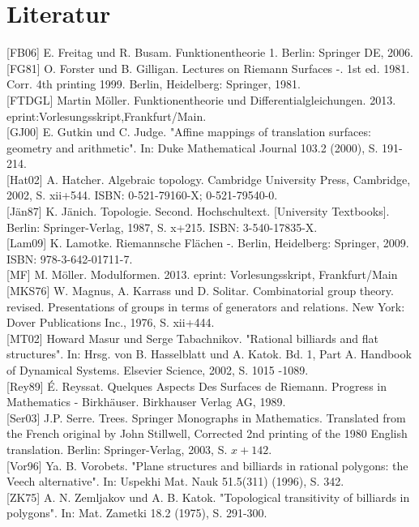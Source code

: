 \documentclass[10pt, letterpaper]{article}
\begin{document}
\section {Literatur}
[FB06] E. Freitag und R. Busam. Funktionentheorie 1. Berlin: Springer DE, 2006.\\[0pt]
[FG81] O. Forster und B. Gilligan. Lectures on Riemann Surfaces -. 1st ed. 1981. Corr. 4th printing 1999. Berlin, Heidelberg: Springer, 1981.\\[0pt]
[FTDGL] Martin Möller. Funktionentheorie und Differentialgleichungen. 2013. eprint:Vorlesungsskript,Frankfurt/Main.\\[0pt]
[GJ00] E. Gutkin und C. Judge. "Affine mappings of translation surfaces: geometry and arithmetic". In: Duke Mathematical Journal 103.2 (2000), S. 191-214.\\[0pt]
[Hat02] A. Hatcher. Algebraic topology. Cambridge University Press, Cambridge, 2002, S. xii+544. ISBN: 0-521-79160-X; 0-521-79540-0.\\[0pt]
[Jän87] K. Jänich. Topologie. Second. Hochschultext. [University Textbooks]. Berlin: Springer-Verlag, 1987, S. x+215. ISBN: 3-540-17835-X.\\[0pt]
[Lam09] K. Lamotke. Riemannsche Flächen -. Berlin, Heidelberg: Springer, 2009. ISBN: 978-3-642-01711-7.\\[0pt]
[MF] M. Möller. Modulformen. 2013. eprint: Vorlesungsskript, Frankfurt/Main\\[0pt]
[MKS76] W. Magnus, A. Karrass und D. Solitar. Combinatorial group theory. revised. Presentations of groups in terms of generators and relations. New York: Dover Publications Inc., 1976, S. xii+444.\\[0pt]
[MT02] Howard Masur und Serge Tabachnikov. "Rational billiards and flat structures". In: Hrsg. von B. Hasselblatt und A. Katok. Bd. 1, Part A. Handbook of Dynamical Systems. Elsevier Science, 2002, S. 1015 -1089.\\[0pt]
[Rey89] É. Reyssat. Quelques Aspects Des Surfaces de Riemann. Progress in Mathematics - Birkhäuser. Birkhauser Verlag AG, 1989.\\[0pt]
[Ser03] J.P. Serre. Trees. Springer Monographs in Mathematics. Translated from the French original by John Stillwell, Corrected 2nd printing of the 1980 English translation. Berlin: Springer-Verlag, 2003, S. $x+142$.\\[0pt]
[Vor96] Ya. B. Vorobets. "Plane structures and billiards in rational polygons: the Veech alternative". In: Uspekhi Mat. Nauk 51.5(311) (1996), S. 342.\\[0pt]
[ZK75] A. N. Zemljakov und A. B. Katok. "Topological transitivity of billiards in polygons". In: Mat. Zametki 18.2 (1975), S. 291-300.



\pagebreak
\printbibliography
\end{document}
